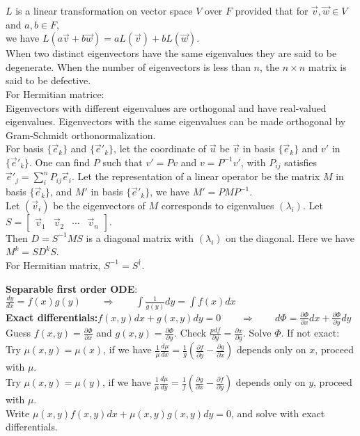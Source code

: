 \documentclass[11pt]{article}
\theoremstyle{break}
\theoremstyle{break}
\newcommand{\pd}{\partial}
\newcommand{\bmat}[1]{\begin{bmatrix}
#1\end{bmatrix}}
\begin{document}
$L$ is a linear transformation on vector space $V$ over $F$ provided that for $\vec{v},\vec{w}\in V$ and $a,b \in F$, \\we have $L(a\vec{v}+b\vec{w}) = aL(\vec{v})+bL(\vec{w})$.\\

When two distinct eigenvectors have the same eigenvalues they are said to be
degenerate. When the number of eigenvectors is less than $n$, the $n \times n$ matrix is said to be defective.\\

For Hermitian matrice: \\Eigenvectors with different eigenvalues are orthogonal and have real-valued eigenvalues. Eigenvectors with the same eigenvalues can be made orthogonal by Gram-Schmidt orthonormalization.\\

For basis $\{\vec{e}_k \}$ and $\{ \vec{e}'_k \}$, let the coordinate of $\vec{u}$ be $\vec{v}$ in basis $\{\vec{e}_k \}$ and $v'$ in $\{\vec{e}'_k \}$. One can find $P$ such that $v' = Pv$ and $v = P^{-1} v'$, with $P_{ij}$ satisfies $\vec{e}'_j = \sum_{i}^n P_{ij} \vec{e}_i$. Let the representation of a linear operator be the matrix $M$ in basis $\{\vec{e}_k \}$, and $M'$ in basis $\{\vec{e}'_k \}$, we have $M' = PMP^{-1}$.\\

Let $(\vec{v}_i)$ be the eigenvectors of $M$ corresponds to eigenvalues $(\lambda_i)$. Let $S = \bmat{\vec{v}_1&\vec{v}_2&\cdots&\vec{v}_n}$.\\
Then $D = S^{-1}MS$ is a diagonal matrix with $(\lambda_i)$ on the diagonal. Here we have $M^k = SD^k S$. \\For Hermitian matrix, $S^{-1} = S^\dagger$. 



\newpage
\textbf{Separable first order ODE}:\qquad  $\frac{dy}{dx} = f(x)g(y) \qquad \Rightarrow \qquad \int \frac{1}{g(y)}dy = \int f(x) dx$\\

\textbf{Exact differentials:}\qquad $f(x,y)dx+g(x,y)dy = 0\qquad\Rightarrow \qquad d\Phi = \frac{\pd \Phi}{\pd x}dx +\frac{\pd \Phi }{\pd y} dy$\\
Guess $f(x,y) = \frac{\pd\Phi}{\pd x}$ and $g(x,y) = \frac{\pd \Phi}{\pd y}$. Check $\frac{pd f}{\pd y} = \frac{\pd x}{\pd g}$. Solve $\Phi$. If not exact:\\ Try $\mu(x,y) = \mu(x)$, if we have $\frac{1}{\mu}\frac{d\mu}{dx} = \frac{1}{g}(\frac{\pd f}{\pd y}-\frac{\pd g}{\pd x})$ depends only on $x$, proceed with $\mu$. \\
Try $\mu(x,y) = \mu(y)$, if we have $\frac{1}{\mu}\frac{d\mu}{dy} = \frac{1}{f}(\frac{\pd g}{\pd x}-\frac{\pd f}{\pd y})$ depends only on $y$, proceed with $\mu$.\\ 
Write $\mu(x,y)f(x,y)dx + \mu(x,y) g(x,y) dy = 0$, and solve with exact differentials.\\
\end{document}
